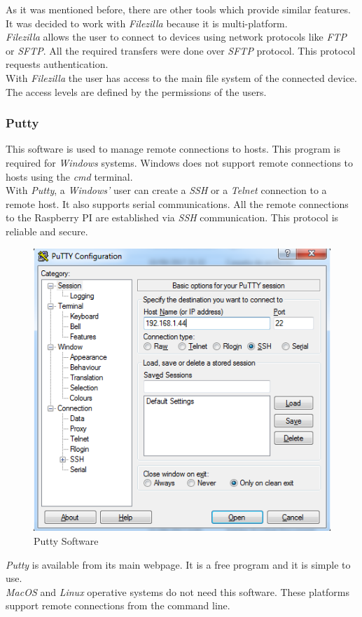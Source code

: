 As it was mentioned before, there are other tools which provide similar features. It was decided to work with \textit{Filezilla} because it is multi-platform.\\

\textit{Filezilla} allows the user to connect to devices using network protocols like \textit{FTP} or \textit{SFTP}. All the required transfers were done over \textit{SFTP} protocol. This protocol requests authentication.\\

With \textit{Filezilla} the user has access to the main file system of the connected device. The access levels are defined by the permissions of the users.

\subsubsection{Putty}

This software is used to manage remote connections to hosts. This program is required for \textit{Windows} systems. Windows does not support remote connections to hosts using the \textit{cmd} terminal.\\

With \textit{Putty}, a \textit{Windows'} user can create a \textit{SSH} or a \textit{Telnet} connection to a remote host. It also supports serial communications. All the remote connections to the Raspberry PI are established via \textit{SSH} communication. This protocol is reliable and secure.\\

\begin{figure}[H]
\begin{centering}
\includegraphics[scale=0.7]{IMGS/PUTTY.PNG}
\caption{Putty Software \label{PYCHARM}}
\end{centering}
\end{figure}

\textit{Putty} is available from its main webpage. It is a free program and it is simple to use.\\

\textit{MacOS} and \textit{Linux} operative systems do not need this software. These platforms support remote connections from the command line.

\newpage
\newpage
